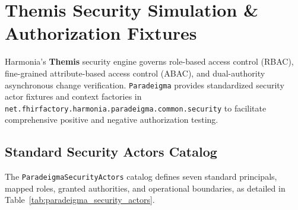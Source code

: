 \section{Themis Security Simulation \& Authorization Fixtures}
\label{sec:paradeigma_security}

Harmonia's \textbf{Themis} security engine governs role-based access control (RBAC), fine-grained attribute-based access control (ABAC), and dual-authority asynchronous change verification. \texttt{Paradeigma} provides standardized security actor fixtures and context factories in \texttt{net.fhirfactory.harmonia.paradeigma.common.security} to facilitate comprehensive positive and negative authorization testing.

\subsection{Standard Security Actors Catalog}

The \texttt{ParadeigmaSecurityActors} catalog defines seven standard principals, mapped roles, granted authorities, and operational boundaries, as detailed in Table~\ref{tab:paradeigma_security_actors}.

